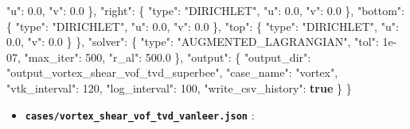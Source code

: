 \documentclass[
  10pt,
]{article}
\newenvironment{Shaded}{}{}
\newcommand{\DataTypeTok}[1]{\textcolor[rgb]{0.56,0.13,0.00}{#1}}
\newcommand{\DecValTok}[1]{\textcolor[rgb]{0.25,0.63,0.44}{#1}}
\newcommand{\FloatTok}[1]{\textcolor[rgb]{0.25,0.63,0.44}{#1}}
\newcommand{\FunctionTok}[1]{\textcolor[rgb]{0.02,0.16,0.49}{#1}}
\newcommand{\KeywordTok}[1]{\textcolor[rgb]{0.00,0.44,0.13}{\textbf{#1}}}
\newcommand{\StringTok}[1]{\textcolor[rgb]{0.25,0.44,0.63}{#1}}
\providecommand{\tightlist}{%
  \setlength{\itemsep}{0pt}\setlength{\parskip}{0pt}}
\begin{document}
\begin{Shaded}
\begin{Highlighting}[]
      \DataTypeTok{"u"}\FunctionTok{:} \FloatTok{0.0}\FunctionTok{,}
      \DataTypeTok{"v"}\FunctionTok{:} \FloatTok{0.0}
    \FunctionTok{\},}
    \DataTypeTok{"right"}\FunctionTok{:} \FunctionTok{\{}
      \DataTypeTok{"type"}\FunctionTok{:} \StringTok{"DIRICHLET"}\FunctionTok{,}
      \DataTypeTok{"u"}\FunctionTok{:} \FloatTok{0.0}\FunctionTok{,}
      \DataTypeTok{"v"}\FunctionTok{:} \FloatTok{0.0}
    \FunctionTok{\},}
    \DataTypeTok{"bottom"}\FunctionTok{:} \FunctionTok{\{}
      \DataTypeTok{"type"}\FunctionTok{:} \StringTok{"DIRICHLET"}\FunctionTok{,}
      \DataTypeTok{"u"}\FunctionTok{:} \FloatTok{0.0}\FunctionTok{,}
      \DataTypeTok{"v"}\FunctionTok{:} \FloatTok{0.0}
    \FunctionTok{\},}
    \DataTypeTok{"top"}\FunctionTok{:} \FunctionTok{\{}
      \DataTypeTok{"type"}\FunctionTok{:} \StringTok{"DIRICHLET"}\FunctionTok{,}
      \DataTypeTok{"u"}\FunctionTok{:} \FloatTok{0.0}\FunctionTok{,}
      \DataTypeTok{"v"}\FunctionTok{:} \FloatTok{0.0}
    \FunctionTok{\}}
  \FunctionTok{\},}
  \DataTypeTok{"solver"}\FunctionTok{:} \FunctionTok{\{}
    \DataTypeTok{"type"}\FunctionTok{:} \StringTok{"AUGMENTED\_LAGRANGIAN"}\FunctionTok{,}
    \DataTypeTok{"tol"}\FunctionTok{:} \DecValTok{1e{-}07}\FunctionTok{,}
    \DataTypeTok{"max\_iter"}\FunctionTok{:} \DecValTok{500}\FunctionTok{,}
    \DataTypeTok{"r\_al"}\FunctionTok{:} \FloatTok{500.0}
  \FunctionTok{\},}
  \DataTypeTok{"output"}\FunctionTok{:} \FunctionTok{\{}
    \DataTypeTok{"output\_dir"}\FunctionTok{:} \StringTok{"output\_vortex\_shear\_vof\_tvd\_superbee"}\FunctionTok{,}
    \DataTypeTok{"case\_name"}\FunctionTok{:} \StringTok{"vortex"}\FunctionTok{,}
    \DataTypeTok{"vtk\_interval"}\FunctionTok{:} \DecValTok{120}\FunctionTok{,}
    \DataTypeTok{"log\_interval"}\FunctionTok{:} \DecValTok{100}\FunctionTok{,}
    \DataTypeTok{"write\_csv\_history"}\FunctionTok{:} \KeywordTok{true}
  \FunctionTok{\}}
\FunctionTok{\}}
\end{Highlighting}
\end{Shaded}

\begin{itemize}
\tightlist
\item
  \textbf{\texttt{cases/vortex\_shear\_vof\_tvd\_vanleer.json}} :
\end{itemize}
\end{document}
